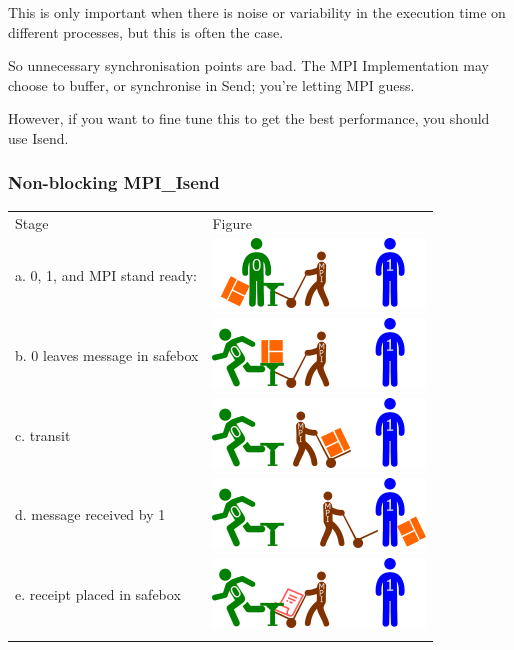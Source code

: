 This is only important when there is noise or variability in the
execution time on different processes, but this is often the case.

So unnecessary synchronisation points are bad. The MPI Implementation
may choose to buffer, or synchronise in Send; you're letting MPI guess.

However, if you want to fine tune this to get the best performance, you
should use Isend.

\subsubsection{Non-blocking MPI\_Isend}\label{non-blocking-mpiux5fisend}

\begin{longtable}[c]{@{}ll@{}}
\toprule\addlinespace
Stage & Figure
\\\addlinespace
\midrule\endhead
a. 0, 1, and MPI stand ready: &
\includegraphics{06MPI/figures/async0.png}
\\\addlinespace
b. 0 leaves message in safebox &
\includegraphics{06MPI/figures/async1.png}
\\\addlinespace
c. transit & \includegraphics{06MPI/figures/asyncT.png}
\\\addlinespace
d. message received by 1 & \includegraphics{06MPI/figures/asyncA.png}
\\\addlinespace
e. receipt placed in safebox &
\includegraphics{06MPI/figures/asyncR.png}
\\\addlinespace
\bottomrule
\end{longtable}

